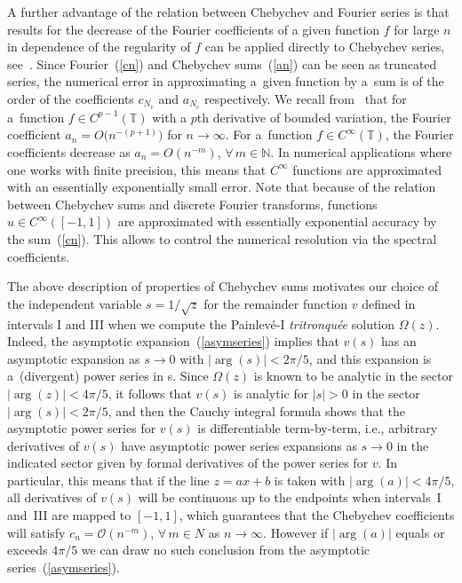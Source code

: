\documentclass[pdftex]{sigma}
\begin{document}
 A further advantage of the relation between Chebychev and Fourier series is that results for the decrease of the Fourier coefficients of a given function $f$ for large $n$ in dependence of the regularity of $f$ can be applied directly to Chebychev series, see~\cite{trefethen,trefethen2}. Since Fourier~(\ref{cn}) and Chebychev sums~(\ref{an}) can be seen as truncated series, the numerical error in approximating a~given function by a~sum is of the order of the coefficients $c_{N_{c}}$ and $a_{N_{c}}$ respectively. We recall from~\cite{trefethen,trefethen2} that for a~function $f\in C^{p-1}(\mathbb{T})$ with a $p$th derivative of bounded variation, the Fourier coefficient $a_{n}=O\big(n^{-(p+1)}\big)$ for $n\to\infty$. For a~function $f\in C^{\infty}(\mathbb{T})$, the Fourier coefficients decrease as $a_{n}=O(n^{-m})$, $\forall\, m\in \mathbb{N}$. In numerical applications where one works with finite precision, this means that $C^{\infty}$ functions are approximated with an essentially exponentially small error. Note that because of the relation between Chebychev sums and discrete Fourier transforms, functions $u\in C^{\infty}([-1,1])$ are approximated with essentially exponential accuracy by the sum~(\ref{cn}). This allows to control the numerical resolution via the spectral coefficients.

\begin{remark}The above description of properties of Chebychev sums motivates our choice of the independent variable $s = 1/ \sqrt{z}$ for the remainder function $v$ defined in intervals I and III when we compute the Painlev\'e-I \emph{tritronqu\'ee} solution $\Omega(z)$. Indeed, the asymptotic expansion~(\ref{asymseries}) implies that $v(s)$ has an asymptotic expansion as $s \to 0$ with $| \arg(s)| < 2\pi/5$, and this expansion is a~(divergent) power series in s. Since $\Omega(z)$ is known to be analytic in the sector $| \arg(z)| < 4\pi/5$, it follows that $v(s)$ is analytic for $|s| > 0$ in the sector $| \arg(s)| < 2\pi/5$, and then the Cauchy integral formula shows that the asymptotic power series for $v(s)$ is differentiable term-by-term, i.e., arbitrary derivatives of $v(s)$ have asymptotic power series expansions as $s \to 0$ in the indicated sector given by
formal derivatives of the power series for $v$. In particular, this means that if the line $z = ax + b$ is taken with $| \arg(a)| < 4\pi/5$, all derivatives of $v(s)$ will be continuous up to the endpoints when intervals~I and~III are mapped to $[-1, 1]$, which guarantees that the Chebychev coefficients will satisfy $c_{n} = \mathcal{O}(n^ {-m} )$, $\forall\, m \in N$ as $n \to \infty$. However if $|\arg(a)|$ equals or exceeds $4\pi/5$ we can draw no such conclusion from the asymptotic series~(\ref{asymseries}).
\end{remark}
\end{document}
